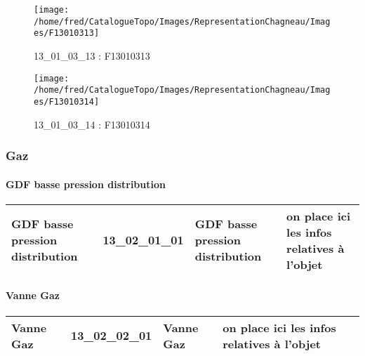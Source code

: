 \documentclass[12pt,titlepage,oneside]{book}
\begin{document}
\begin{figure}[h!]
\begin{minipage}[t]{3cm}
  \end{minipage}
  \begin{minipage}[t]{3cm}
    \begin{center}
      \texttt{[image: /home/fred/CatalogueTopo/Images/RepresentationChagneau/Images/F13010313]}
      \caption[F13010313]{\label{} 13\_01\_03\_13 : F13010313}
    \end{center}
  \end{minipage}
  \begin{minipage}[t]{3cm}
    \begin{center}
      \texttt{[image: /home/fred/CatalogueTopo/Images/RepresentationChagneau/Images/F13010314]}
      \caption[F13010314]{\label{} 13\_01\_03\_14 : F13010314}
    \end{center}
  \end{minipage}
\end{figure}

\subsubsection{\large Gaz}
\paragraph{GDF basse pression distribution}
\noindent
\vspace{\baselineskip}

\renewcommand{\arraystretch}{1.2}
\begin{supertabular}{|p{10cm}|c|p{13cm}|p{12cm}|}
 GDF basse pression distribution & 13\_02\_01\_01 & GDF basse pression distribution & on place ici les infos relatives à l'objet\\
\hline
\end{supertabular}
\begin{figure}[h!]
  \hfill         %
\end{figure}


\paragraph{Vanne Gaz}
\noindent
\vspace{\baselineskip}

\renewcommand{\arraystretch}{1.2}
\begin{supertabular}{|p{10cm}|c|p{13cm}|p{12cm}|}
 Vanne Gaz & 13\_02\_02\_01 & Vanne Gaz & on place ici les infos relatives à l'objet\\
\hline
\end{supertabular}
\begin{figure}[h!]
  \hfill         %
\end{figure}
\end{document}
